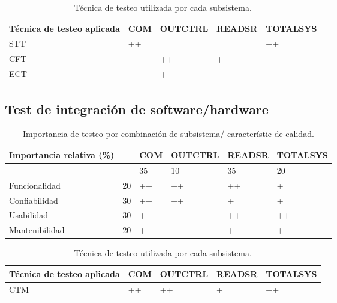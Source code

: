 \documentclass[12pt,a4paper, twosite]{article}
\begin{document}
\begin{table}[ht]
    \centering
    \begin{tabular}{|l|l|l|l|l|}\hline \hline
 Técnica de testeo aplicada & COM & OUTCTRL & READSR & TOTALSYS\\
        \hline
       STT & ++ & & & ++ \\
      CFT & & ++ & + & \\
      ECT & & + & &  \\
        \hline
    \end{tabular}
    \caption{Técnica de testeo utilizada por cada subsistema.}
\end{table}

\subsection{Test de integración de software/hardware}
\begin{table}[ht]
    \centering
    \begin{tabular}{|l|l|l|l|l|l|}\hline \hline
 Importancia relativa (\%)& &  COM & OUTCTRL & READSR & TOTALSYS\\
        \hline
       
         &  &35 & 10 &35 & 20                          \\
        Funcionalidad    & 20 & ++ & ++ & ++ & +		\\
        Confiabilidad    & 30 & ++ & ++ & +& +                        \\
        Usabilidad       & 30 & ++ & + & ++ & ++                        \\
        Mantenibilidad   & 20 & + & + & + & +                        \\
        \hline
    \end{tabular}
    \caption{Importancia de testeo por combinación de subsistema/ característic de calidad.}
\end{table}


\begin{table}[ht]
    \centering
    \begin{tabular}{|l|l|l|l|l|}\hline \hline
 Técnica de testeo aplicada & COM & OUTCTRL & READSR & TOTALSYS\\
        \hline
       CTM & ++ & ++ & + & ++ \\
        \hline
    \end{tabular}
    \caption{Técnica de testeo utilizada por cada subsistema.}
\end{table}
\end{document}
